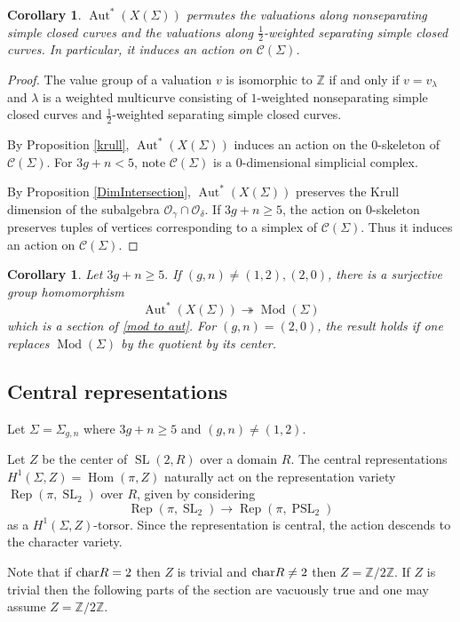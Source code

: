 \documentclass[11pt]{amsart}
\numberwithin{theorem}{section}
\newtheorem{corollary}[theorem]{Corollary}
\theoremstyle{definition}
\theoremstyle{remark}
\newcommand{\Z}{{\mathbb{Z}}}
\newcommand{\Ccal}{{\mathcal{C}}}
\newcommand{\Ocal}{{\mathcal{O}}}
\renewcommand{\char}{\textup{char}}
\DeclareMathOperator{\Aut}{Aut}
\DeclareMathOperator{\Hom}{Hom}
\DeclareMathOperator{\Mod}{Mod}
\DeclareMathOperator{\PSL}{PSL}
\DeclareMathOperator{\Rep}{Rep}
\DeclareMathOperator{\SL}{SL}
\newcommand{\<}{\langle}
\renewcommand{\>}{\rangle}
\begin{document}
\begin{corollary}
    $\Aut^*(X(\Sigma))$ permutes the valuations along nonseparating simple closed curves and the valuations along $\frac 12$-weighted separating simple closed curves. In particular, it induces an action on $\Ccal(\Sigma)$.
\end{corollary}


\begin{proof}
    The value group of a valuation $v$ is isomorphic to $\Z$ if and only if $v = v_\lambda$ and $\lambda$ is a weighted multicurve consisting of $1$-weighted nonseparating simple closed curves and $\frac 12$-weighted separating simple closed curves.

    By Proposition \ref{krull}, $\Aut^*(X(\Sigma))$ induces an action on the $0$-skeleton of $\Ccal(\Sigma)$. For $3g + n < 5$, note $\Ccal(\Sigma)$ is a $0$-dimensional simplicial complex.

    By Proposition \ref{DimIntersection}, $\Aut^*(X(\Sigma))$ preserves the Krull dimension of the subalgebra $\Ocal_\gamma \cap \Ocal_\delta$. If $3g + n \geq 5$, the action on $0$-skeleton preserves tuples of vertices corresponding to a simplex of $\Ccal(\Sigma)$. Thus it induces an action on $\Ccal(\Sigma)$.
\end{proof}

\begin{corollary}
Let $3g + n \geq 5.$ If $(g,n) \neq (1,2), (2,0)$, there is a surjective group homomorphism 
\[
\Aut^*(X(\Sigma)) \twoheadrightarrow \Mod(\Sigma)
\] 
which is a section of \ref{mod to aut}. 
For $(g, n) = (2, 0)$, the result holds if one replaces $\Mod(\Sigma)$ by the quotient by its center.
\end{corollary}

\subsection{Central representations}

Let $\Sigma = \Sigma_{g, n}$ where $3g +n \geq 5$ and $(g, n) \neq (1, 2)$. 

Let $Z$ be the center of $\SL(2,R)$ over a domain $R$. The central representations $H^1(\Sigma, Z) = \Hom(\pi , Z)$ naturally act on the representation variety $\Rep(\pi, \SL_2)$ over $R$, given by considering
\[
\Rep(\pi, \SL_2) \rightarrow \Rep(\pi, \PSL_2)
\]
as a $H^1(\Sigma, Z)$-torsor. Since the representation is central, the action descends to the character variety.

Note that if $\char R = 2$ then $Z$ is trivial and $\char R \neq 2$ then $Z = \Z/2\Z$. If $Z$ is trivial then the following parts of the section are vacuously true and one may assume $Z = \Z / 2\Z$.
\end{document}
